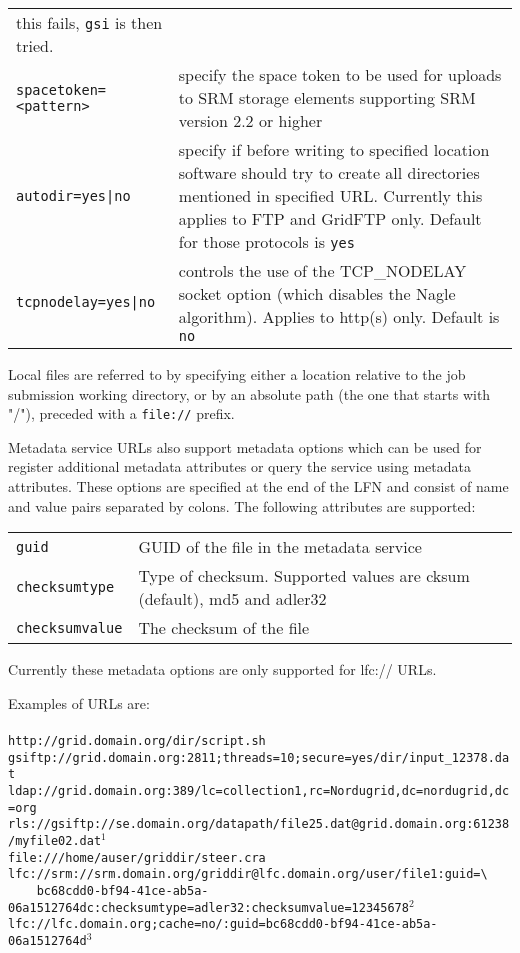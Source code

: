 \begin{longtable}{lp{10cm}}
   this fails, \verb#gsi# is then tried.\\
   \verb#spacetoken=<pattern># & specify the space token to be used for
   uploads to SRM storage elements supporting SRM version 2.2 or higher\\
   \verb#autodir=yes|no# & specify if before writing to specified location
   software should try to create all directories mentioned in specified
   URL. Currently this applies to FTP and GridFTP only. Default for those
   protocols is \verb#yes#\\
   \verb#tcpnodelay=yes|no# & controls the use of the TCP\_NODELAY
   socket option (which disables the Nagle algorithm). Applies to
   http(s) only. Default is \verb#no#\\ 
\end{longtable}

Local files are referred to by specifying either a location relative
to the job submission working directory, or by an absolute path (the
one that starts with "/"), preceded with a \verb#file://# prefix.

Metadata service URLs also support metadata options which can be used
for register additional metadata attributes or query the service using
metadata attributes. These options are specified at the end of the LFN
and consist of name and value pairs separated by colons. The following
attributes are supported:

\begin{tabular}{lp{10cm}}
   \verb#guid# & GUID of the file in the metadata service \\
   \verb#checksumtype# & Type of checksum. Supported values are cksum
   (default), md5 and adler32 \\
   \verb#checksumvalue# & The checksum of the file \\
\end{tabular}

Currently these metadata options are only supported for lfc:// URLs.

\begin{framed}
   Examples of URLs are:\\
   \\
   \verb#http://grid.domain.org/dir/script.sh#\\
   \verb#gsiftp://grid.domain.org:2811;threads=10;secure=yes/dir/input_12378.dat#\\
   \verb#ldap://grid.domain.org:389/lc=collection1,rc=Nordugrid,dc=nordugrid,dc=org#\\
   \verb#rls://gsiftp://se.domain.org/datapath/file25.dat@grid.domain.org:61238/myfile02.dat#$^1$\\
   \verb#file:///home/auser/griddir/steer.cra#\\
   \verb#lfc://srm://srm.domain.org/griddir@lfc.domain.org/user/file1:guid=\# \\
   \verb#    bc68cdd0-bf94-41ce-ab5a-06a1512764dc:checksumtype=adler32:checksumvalue=12345678#$^2$\\
   \verb#lfc://lfc.domain.org;cache=no/:guid=bc68cdd0-bf94-41ce-ab5a-06a1512764d#$^3$\\
\end{framed}


